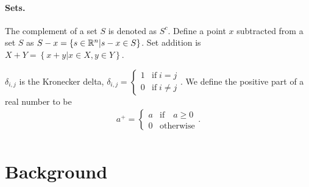 \documentclass{article}
\begin{document}
\paragraph*{Sets.}
The complement of a set $S$ is denoted as $S^c$.
Define a point $x$ subtracted from a set $S$ as $S - x = \left\{s \in \mathbb R^n | s - x \in S\right\}$.
Set addition is $X + Y = \left\{x + y | x \in X, y \in Y\right\}$.

$\delta_{i,j}$ is the Kronecker delta, $\delta_{i, j} = \begin{cases} 1 & \textrm{if} \; i = j \\ 0 & \textrm{if} \; i \ne j \end{cases}$.
We define the positive part of a real number to be
\begin{align*}
a^+ = \begin{cases} a & \textrm{if} \quad a \ge 0 \\ 0 & \textrm{otherwise} \end{cases}.\\
\end{align*}



\section{Background}
\end{document}
